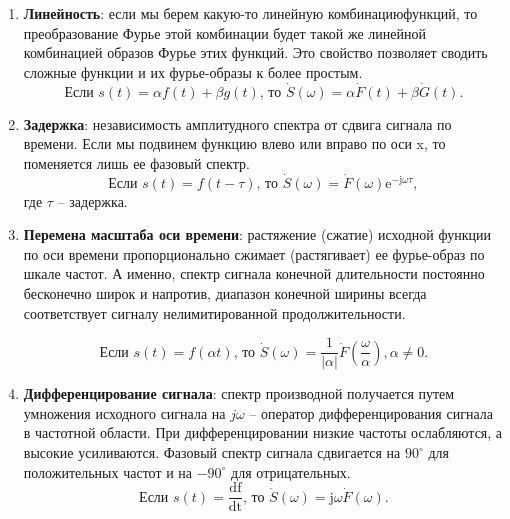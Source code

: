\documentclass[12pt,a4paper]{article}
\begin{document}
\begin{enumerate}
\item \textbf{Линейность}: если мы берем какую-то линейную комбинацию\linebreak функций, то преобразование Фурье этой комбинации будет такой же линейной комбинацией образов Фурье этих функций. Это свойство позволяет сводить сложные функции и их фурье-образы к более простым.
\begin{equation}
\nonumber
\text{Если }
s\left(t\right)=\alpha f\left(t\right)+\beta g\left(t\right)
\text{, то }
\dot{S}\left(\omega\right)=\alpha\dot{F}\left(t\right)+\beta\dot{G}\left(t\right).
\end{equation}

\item \textbf{Задержка}: независимость амплитудного спектра от сдвига сигнала по времени. Если мы подвинем функцию влево или вправо по оси x, то поменяется лишь ее фазовый спектр.
\begin{equation}
\nonumber
\text{Если }
s\left(t\right)=f\left(t-\tau\right)
\text{, то }
\dot{S}\left(\omega\right)=\dot{F}\left(\omega\right)\mathrm{e}^{-\mathrm{j}\omega\tau},
\end{equation}
где $\tau$ -- задержка.

\item \textbf{Перемена масштаба оси времени}: растяжение (сжатие) исходной функции по оси времени пропорционально сжимает (растягивает) ее фурье-образ по шкале частот. А именно, спектр сигнала конечной длительности постоянно бесконечно широк и напротив, диапазон конечной ширины всегда соответствует сигналу нелимитированной продолжительности. 

\begin{equation}
\nonumber
\text{Если }
s\left(t\right)=f\left(\alpha t\right)
\text{, то }
\dot{S}\left(\omega\right)=\frac{1}{|\alpha|}\dot{F}\left(\frac{\omega}{\alpha}\right), \alpha\neq 0.
\end{equation}

\item \textbf{Дифференцирование сигнала}: спектр производной получается путем умножения исходного сигнала на $j\omega$ -- оператор дифференцирования сигнала в частотной области. При дифференцировании низкие частоты ослабляются, а высокие усиливаются. Фазовый спектр сигнала сдвигается на $90^\circ$ для положительных частот и на $-90^\circ$ для отрицательных.
\begin{equation}
\text{Если }
s\left(t\right)=\frac{\mathrm{df}}{\mathrm{dt}}
\text{, то }
\dot{S}\left(\omega\right)=\mathrm{j}\omega\dot{F}\left(\omega\right).
\label{eq:diff_trans}
\end{equation}


\end{enumerate}
\end{document}
